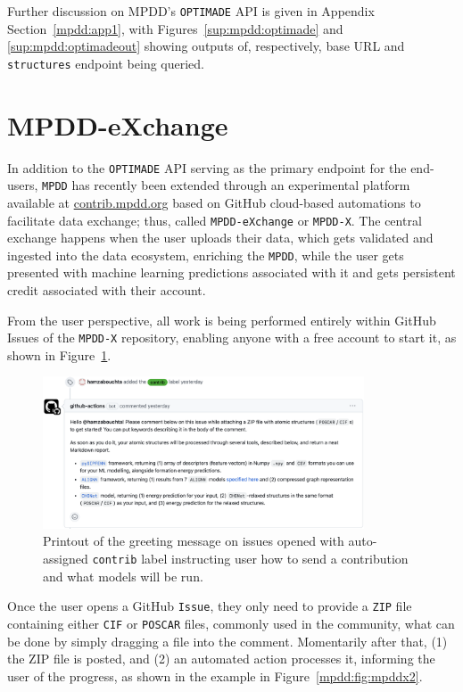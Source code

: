 Further discussion on MPDD's \texttt{OPTIMADE} API is given in Appendix Section~\ref{mpdd:app1}, with Figures~\ref{sup:mpdd:optimade} and \ref{sup:mpdd:optimadeout} showing outputs of, respectively, base URL and \texttt{structures} endpoint being queried.

\section{MPDD-eXchange} \label{mpdd:sec:mpddx}

In addition to the \texttt{OPTIMADE} API serving as the primary endpoint for the end-users, \texttt{MPDD} has recently been extended through an experimental platform available at \href{https://contrib.mpdd.org}{contrib.mpdd.org} based on GitHub cloud-based automations to facilitate data exchange; thus, called \texttt{MPDD-eXchange} or \texttt{MPDD-X}. The central exchange happens when the user uploads their data, which gets validated and ingested into the data ecosystem, enriching the \texttt{MPDD}, while the user gets presented with machine learning predictions associated with it and gets persistent credit associated with their account. 

From the user perspective, all work is being performed entirely within GitHub Issues of the \texttt{MPDD-X} repository, enabling anyone with a free account to start it, as shown in Figure~\ref{mpdd:fig:mpddx1}. 

\begin{figure}[H]
    \centering
    \includegraphics[width=0.85\textwidth]{mpdd/mpddx1.png}
    \caption{Printout of the greeting message on issues opened with auto-assigned \texttt{contrib} label instructing user how to send a contribution and what models will be run.}
    \label{mpdd:fig:mpddx1}
\end{figure}

Once the user opens a GitHub \texttt{Issue}, they only need to provide a \texttt{ZIP} file containing either \texttt{CIF} \cite{Hall1991TheCrystallography} or \texttt{POSCAR} \cite{VASPPOSCAR} files, commonly used in the community, what can be done by simply dragging a file into the comment. Momentarily after that, (1) the ZIP file is posted, and (2) an automated action processes it, informing the user of the progress, as shown in the example in Figure~\ref{mpdd:fig:mpddx2}.

